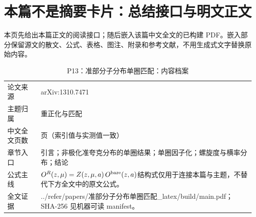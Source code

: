 \documentclass[UTF8,11pt,oneside]{ctexbook}
\begin{document}
\section*{本篇不是摘要卡片：总结接口与明文正文}
本页先给出本篇正文的阅读接口；随后嵌入该篇中文全文的已构建 PDF。嵌入部分保留源文的散文、公式、表格、图注、附录和参考文献，不用生成式文字替换原始内容。
\begin{table}[htbp]
  \centering
  \caption{P13：准部分子分布单圈匹配：内容档案}
  \small
  \begin{tabularx}{0.96\textwidth}{@{}p{3.3cm}>{\raggedright\arraybackslash}X@{}}
    \toprule
    论文来源 & arXiv:1310.7471 \\
    主题归属 & 重正化与匹配 \\
    中文全文页数 & 9 页（索引值与实测值一致） \\
    章节入口 & 引言；非极化准夸克分布的单圈结果；单圈因子化；螺旋度与横率分布；结论 \\
    公式主线 & $O^{R}(z,\mu)=Z(z,\mu,a)\,O^{\rm bare}(z,a)$\newline\scriptsize 结构式仅用于连接本篇与主题，不替代下方全文中的原文公式。 \\
    全文证据 & ../\allowbreak{}refer/\allowbreak{}papers/\allowbreak{}准部分子分布单圈匹配\_\allowbreak{}latex/\allowbreak{}build/\allowbreak{}main.pdf；SHA-256 见机器可读 manifest。 \\
    \bottomrule
  \end{tabularx}
\end{table}
\end{document}
